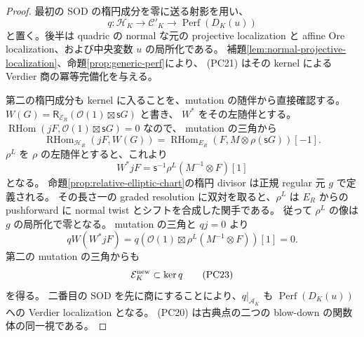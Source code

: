 \begin{proof}
最初の SOD の楕円成分を零に送る射影を用い、
\[
 q:\mathcal H_K\longrightarrow\mathcal C'_K
       \longrightarrow\operatorname{Perf}(D_K(u))
 \tag{PC21}
\]
と置く。後半は quadric の normal な元の projective localization と
affine Ore localization、および中央変数 $u$ の局所化である。
補題\ref{lem:normal-projective-localization}、命題\ref{prop:generic-perf}により、
(PC21) はその kernel による Verdier 商の冪等完備化を与える。

第二の楕円成分も kernel に入ることを、mutation の随伴から直接確認する。
$W(G)=\mathsf R_{\mathcal E_R}(\mathcal O(1)\boxtimes\mathsf sG)$ と書き、
$W^*$ をその左随伴とする。
$\operatorname{RHom}(jF,\mathcal O(1)\boxtimes\mathsf sG)=0$ なので、
mutation の三角から
\[
 \operatorname{RHom}_{\mathcal H_R}(jF,W(G))
 =\operatorname{RHom}_{E_R}(F,M\otimes\rho(\mathsf sG))[-1].
\]
$\rho^L$ を $\rho$ の左随伴とすると、これより
\[
          W^*jF=\mathsf s^{-1}\rho^L(M^{-1}\otimes F)[1]
          \tag{PC22}
\]
となる。
命題\ref{prop:relative-elliptic-chart}の楕円 divisor は正規 regular 元 $g$ で定義される。
その長さ一の graded resolution に双対を取ると、$\rho^L$ は $E_R$ からの
pushforward に normal twist とシフトを合成した関手である。
従って $\rho^L$ の像は $g$ の局所化で零となる。
mutation の三角と $qj=0$ より
\[
 qW(W^*jF)
 =q(\mathcal O(1)\boxtimes\rho^L(M^{-1}\otimes F))[1]=0.
\]
第二の mutation の三角からも
\[
             \mathcal E_K^{\rm new}\subset\ker q
 \tag{PC23}
\]
を得る。
二番目の SOD を先に商にすることにより、$q|_{\mathcal A_K}$ も
$\operatorname{Perf}(D_K(u))$ への Verdier localization となる。
(PC20) は古典点の二つの blow-down の関数体の同一視である。


\end{proof}

